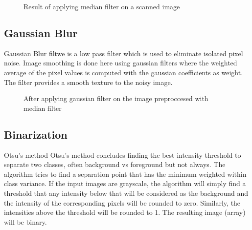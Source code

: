 \documentclass[9pt,twocolumn,twoside]{../../styles/osajnl}
\begin{document}
\begin{figure}[H]
\centering
{}
\caption{Result of applying median filter on a scanned image}
\label{fig:median}
\end{figure}


\subsection{Gaussian Blur}
Gaussian Blur filtwe is a low pass filter which is used to eliminate
isolated pixel noise. Image smoothing is done here using gaussian
filters where the weighted average of the pixel values is computed
with the gaussian coefficients as weight. The filter provides a smooth
texture to the noisy image.

\begin{figure}[H]
\centering
{}
\caption{After applying gaussian filter on the image preproccesed with median filter}
\end{figure}


\subsection{ Binarization}

Otsu’s method \cite{otsu1975threshold} Otsu’s method concludes finding
the best intensity threshold to separate two classes, often background
vs foreground but not always. The algorithm tries to find a separation
point that has the minimum weighted within class variance.  If the
input images are grayscale, the algorithm will simply find a threshold
that any intensity below that will be considered as the background and
the intensity of the corresponding pixels will be rounded to
zero. Similarly, the intensities above the threshold will be rounded
to 1. The resulting image (array) will be binary.
\end{document}
